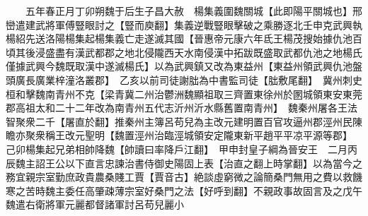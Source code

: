 　　五年春正月丁卯朔魏于后生子昌大赦　楊集義圍魏關城【此即陽平關城也】邢巒遣建武將軍傅豎眼討之【豎而庾翻】集義逆戰豎眼擊破之乘勝逐北壬申克武興執楊紹先送洛陽楊集起楊集義亡走遂滅其國【晉惠帝元康六年氐王楊茂搜始據仇池百頃其後浸盛盡有漢武都郡之地北侵隴西天水南侵漢中拓跋既盛取武都仇池之地楊氏僅據武興今魏既取漢中遂滅楊氏】以為武興鎮又改為東益州【東益州領武興仇池盤頭廣長廣業梓潼洛叢郡】　乙亥以前司徒謝朏為中書監司徒【朏敷尾翻】　冀州刺史桓和擊魏南青州不克【梁青冀二州治鬱洲魏顯祖取三齊置東徐州於圂城領東安東莞郡高祖太和二十二年改為南青州五代志沂州沂水縣舊置南青州】　魏秦州屠各王法智聚衆二千【屠直於翻】推秦州主簿呂苟兒為主改元建明置百官攻逼州郡涇州民陳瞻亦聚衆稱王改元聖明【魏置涇州治臨涇城領安定隴東新平趙平平凉平源等郡】　己卯楊集起兄弟相帥降魏【帥讀曰率降戶江翻】　甲申封皇子綱為晉安王　二月丙辰魏主詔王公以下直言忠諫治書侍御史陽固上表【治直之翻上時掌翻】以為當今之務宜親宗室勤庶政貴農桑賤工賈【賈音古】絶談虛窮微之論簡桑門無用之費以救饑寒之苦時魏主委任高肇疎薄宗室好桑門之法【好呼到翻】不親政事故固言及之戊午魏遣右衛將軍元麗都督諸軍討呂苟兒麗小

